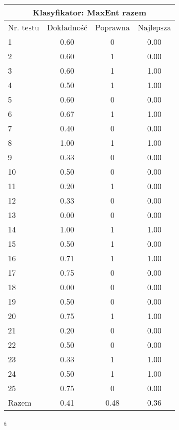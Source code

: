 \documentclass[notitlepage,leqno,fleqn,a4paper]{article}
\begin{document}
\begin{tabular}{|l|c|c|c|}
\hline
\multicolumn{4}{|c|}{Klasyfikator: MaxEnt razem}\\
\hline
Nr. testu & Dokładność & Poprawna & Najlepsza\\
\hline
1 & 0.60 & 0 & 0.00 \\
2 & 0.60 & 1 & 0.00 \\
3 & 0.60 & 1 & 1.00 \\
4 & 0.50 & 1 & 1.00 \\
5 & 0.60 & 0 & 0.00 \\
6 & 0.67 & 1 & 1.00 \\
7 & 0.40 & 0 & 0.00 \\
8 & 1.00 & 1 & 1.00 \\
9 & 0.33 & 0 & 0.00 \\
10 & 0.50 & 0 & 0.00 \\
11 & 0.20 & 1 & 0.00 \\
12 & 0.33 & 0 & 0.00 \\
13 & 0.00 & 0 & 0.00 \\
14 & 1.00 & 1 & 1.00 \\
15 & 0.50 & 1 & 0.00 \\
16 & 0.71 & 1 & 1.00 \\
17 & 0.75 & 0 & 0.00 \\
18 & 0.00 & 0 & 0.00 \\
19 & 0.50 & 0 & 0.00 \\
20 & 0.75 & 1 & 1.00 \\
21 & 0.20 & 0 & 0.00 \\
22 & 0.50 & 0 & 0.00 \\
23 & 0.33 & 1 & 1.00 \\
24 & 0.50 & 1 & 1.00 \\
25 & 0.75 & 0 & 0.00 \\
\hline
Razem & 0.41 & 0.48 & 0.36 \\
\hline
\end{tabular}
t
\end{document}
